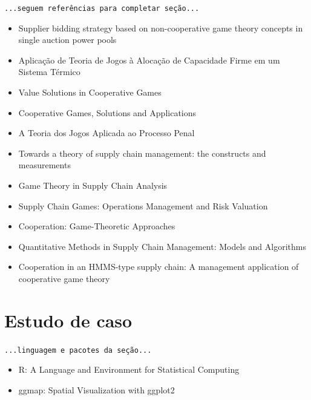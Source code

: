 \documentclass[
	article,			        %
	11pt,				          %
	oneside,			        %
	a4paper,			        %
	english,			        %
	brazil,				        %
	sumario=tradicional
]{abntex2}\usepackage[]{graphicx}\usepackage[]{color}
\begin{document}
  \texttt{\color{red}...seguem refer\^encias para completar seção...}
  \begin{itemize}
    \item Supplier bidding strategy based on non-cooperative game theory concepts in single auction power pools \cite{Kang.2007}
    \item Aplicação de Teoria de Jogos à Alocação de Capacidade Firme em um Sistema Térmico \cite{Ayala.2008}
    \item Value Solutions in Cooperative Games \cite{Mccain.2013} 
    \item Cooperative Games, Solutions and Applications \cite{Driessen.2013}
    \item A Teoria dos Jogos Aplicada ao Processo Penal \cite{Rosa.2014}
    \item Towards a theory of supply chain management: the constructs and measurements \cite{Chen.2004}
    \item Game Theory in Supply Chain Analysis \cite{Cachon.2004}
    \item Supply Chain Games: Operations Management and Risk Valuation \cite{kogan.2007}
    \item Cooperation: Game-Theoretic Approaches \cite{Hart.2012}
    \item Quantitative Methods in Supply Chain Management: Models and Algorithms \cite{Christou.2012}
    \item Cooperation in an HMMS-type supply chain: A management application of cooperative game theory \cite{Dobos.2010b}
  \end{itemize}

\section{Estudo de caso}

  \texttt{\color{red}...linguagem e pacotes da seção...}
  \begin{itemize}
    \item R: A Language and Environment for Statistical Computing \cite{R.2016}
    \item ggmap: Spatial Visualization with ggplot2 \cite{Kahle.2013}
  \end{itemize}
\end{document}
